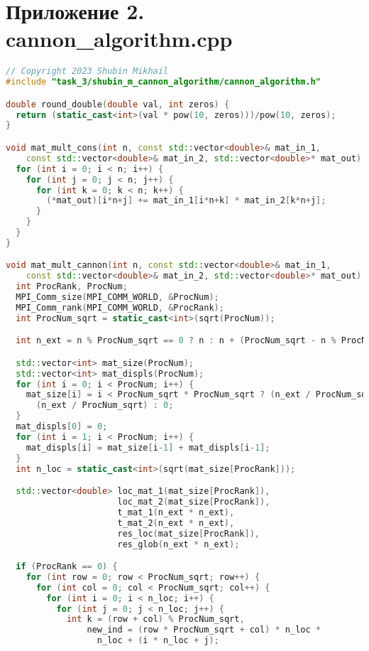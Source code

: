 \documentclass{report}
\begin{document}
\section*{Приложение 2. cannon\_algorithm.cpp}
\begin{lstlisting}[language=C++]
// Copyright 2023 Shubin Mikhail
#include "task_3/shubin_m_cannon_algorithm/cannon_algorithm.h"

double round_double(double val, int zeros) {
  return (static_cast<int>(val * pow(10, zeros)))/pow(10, zeros);
}

void mat_mult_cons(int n, const std::vector<double>& mat_in_1,
    const std::vector<double>& mat_in_2, std::vector<double>* mat_out) {
  for (int i = 0; i < n; i++) {
    for (int j = 0; j < n; j++) {
      for (int k = 0; k < n; k++) {
        (*mat_out)[i*n+j] += mat_in_1[i*n+k] * mat_in_2[k*n+j];
      }
    }
  }
}

void mat_mult_cannon(int n, const std::vector<double>& mat_in_1,
    const std::vector<double>& mat_in_2, std::vector<double>* mat_out) {
  int ProcRank, ProcNum;
  MPI_Comm_size(MPI_COMM_WORLD, &ProcNum);
  MPI_Comm_rank(MPI_COMM_WORLD, &ProcRank);
  int ProcNum_sqrt = static_cast<int>(sqrt(ProcNum));

  int n_ext = n % ProcNum_sqrt == 0 ? n : n + (ProcNum_sqrt - n % ProcNum_sqrt);

  std::vector<int> mat_size(ProcNum);
  std::vector<int> mat_displs(ProcNum);
  for (int i = 0; i < ProcNum; i++) {
    mat_size[i] = i < ProcNum_sqrt * ProcNum_sqrt ? (n_ext / ProcNum_sqrt) *
      (n_ext / ProcNum_sqrt) : 0;
  }
  mat_displs[0] = 0;
  for (int i = 1; i < ProcNum; i++) {
    mat_displs[i] = mat_size[i-1] + mat_displs[i-1];
  }
  int n_loc = static_cast<int>(sqrt(mat_size[ProcRank]));

  std::vector<double> loc_mat_1(mat_size[ProcRank]),
                      loc_mat_2(mat_size[ProcRank]),
                      t_mat_1(n_ext * n_ext),
                      t_mat_2(n_ext * n_ext),
                      res_loc(mat_size[ProcRank]),
                      res_glob(n_ext * n_ext);

  if (ProcRank == 0) {
    for (int row = 0; row < ProcNum_sqrt; row++) {
      for (int col = 0; col < ProcNum_sqrt; col++) {
        for (int i = 0; i < n_loc; i++) {
          for (int j = 0; j < n_loc; j++) {
            int k = (row + col) % ProcNum_sqrt,
                new_ind = (row * ProcNum_sqrt + col) * n_loc *
                  n_loc + (i * n_loc + j);


\end{lstlisting}
\end{document}
